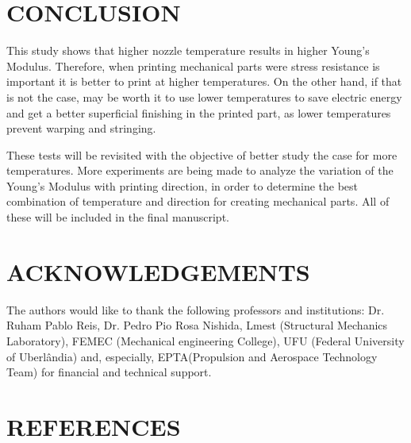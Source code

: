 \documentclass[10pt,fleqn,a4paper,twoside]{article}
\begin{document}
\section{CONCLUSION}
This study shows that higher nozzle temperature results in higher Young's Modulus. Therefore, when printing mechanical parts were stress resistance is important it is better to print at higher temperatures. On the other hand, if that is not the case, may be worth it to use lower temperatures to save electric energy and get a better superficial finishing in the printed part, as lower temperatures prevent warping and stringing. 

These tests will be revisited with the objective of better study the case for more temperatures. 
More experiments are being made to analyze the variation of the Young's Modulus with printing direction, in order to determine the best combination of temperature and direction for creating mechanical parts. All of these will be included in the final manuscript. 







\section{ACKNOWLEDGEMENTS}
The authors would like to thank the following professors and institutions: Dr. Ruham Pablo Reis, Dr. Pedro Pio Rosa Nishida, Lmest (Structural Mechanics Laboratory), FEMEC (Mechanical engineering College), UFU (Federal University of Uberl\^andia) and, especially, EPTA(Propulsion and Aerospace Technology Team) for financial and technical support.




\section{REFERENCES} 


\renewcommand{\refname}{}

\end{document}
